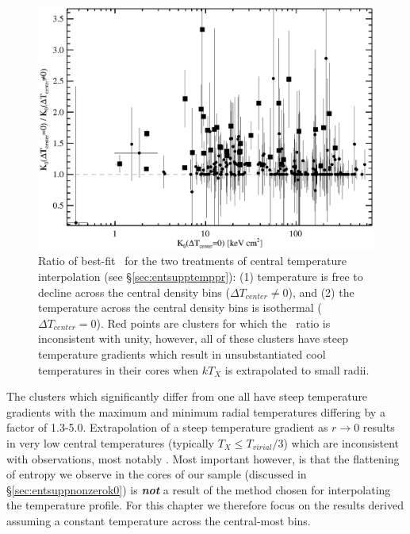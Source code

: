 \begin{figure}[htp]
  \begin{center}
    \begin{minipage}[htp]{\linewidth}
      \includegraphics*[width=\textwidth, trim=5mm 0mm 5mm 5mm, clip]{itplflat_rat}
      \caption[Ratio of best-fit \kna\ for temperature interpolation
        schemes.]{Ratio of best-fit \kna\ for the two treatments of
        central temperature interpolation (see
        \S\ref{sec:entsupptemppr}): (1) temperature is free to decline
        across the central density bins ($\Delta T_{center} \ne 0$),
        and (2) the temperature across the central density bins is
        isothermal ($\Delta T_{center} = 0$). Red points are clusters
        for which the \kna\ ratio is inconsistent with unity, however,
        all of these clusters have steep temperature gradients which
        result in unsubstantiated cool temperatures in their cores
        when $kT_X$ is extrapolated to small radii.}
      \label{fig:kcomp}
    \end{minipage}
  \end{center}
\end{figure}

The clusters which significantly differ from one all have steep
temperature gradients with the maximum and minimum radial temperatures
differing by a factor of 1.3-5.0. Extrapolation of a steep temperature
gradient as $r \rightarrow 0$ results in very low central temperatures
(typically $T_X \leq T_{virial}/3$) which are inconsistent with
observations, most notably \citet{peterson03}. Most important however,
is that the flattening of entropy we observe in the cores of our
sample (discussed in \S\ref{sec:entsuppnonzerok0}) is
{\bfseries\em{not}} a result of the method chosen for interpolating
the temperature profile. For this chapter we therefore focus on the
results derived assuming a constant temperature across the
central-most bins.

